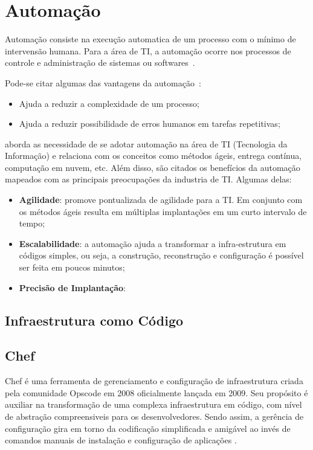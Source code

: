 \section{Automação}
\label{sec:auto}

Automação consiste na execução automatica de um processo com o mínimo de
intervensão humana. Para a área de TI, a automação ocorre nos processos de
controle e administração de sistemas ou softwares~\cite{sharma:2015}.

Pode-se citar algumas das vantagens da automação~\cite{sharma:2015}:
\begin{itemize}
  \item Ajuda a reduzir a complexidade de um processo;
  \item Ajuda a reduzir possibilidade de erros humanos em tarefas
    repetitivas;
\end{itemize}

 aborda as necessidade de se adotar automação na área
de TI (Tecnologia da Informação) e relaciona com os conceitos como métodos
ágeis, entrega contínua, computação em nuvem, etc. Além disso, são citados
os benefícios da automação mapeados com as principais preocupações da industria
de TI. Algumas delas:
\begin{itemize}
  \item \textbf{Agilidade}: promove pontualizada de agilidade para a TI. Em conjunto
    com os métodos ágeis resulta em múltiplas implantações em um curto intervalo
    de tempo;
  \item \textbf{Escalabilidade}: a automação ajuda a transformar a infra-estrutura
    em códigos simples, ou seja, a construção, reconstrução e configuração é possível
    ser feita em poucos minutos;
    \item \textbf{Precisão de Implantação}: 
\end{itemize}

\subsection{Infraestrutura como Código}

\subsection{Chef}
\label{sec:chef}

Chef é uma ferramenta de gerenciamento e configuração de infraestrutura criada
pela comunidade Opscode em 2008 oficialmente lançada em 2009. Seu propósito é
auxiliar na transformação de uma complexa infraestrutura em código, com nível
de abstração compreensiveis para os desenvolvedores. Sendo assim,
a gerência de configuração gira em torno da codificação simplificada e amigável
ao invés de comandos manuais de instalação e configuração de aplicações
\cite{sharma:2015}.


